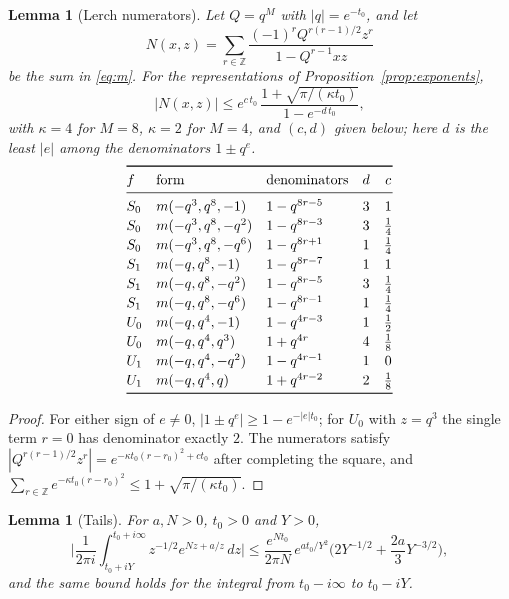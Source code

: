 \documentclass[11pt]{amsart}
\newtheorem{lemma}[theorem]{Lemma}
\theoremstyle{definition}
\theoremstyle{remark}
\numberwithin{equation}{section}
\newcommand{\Z}{\mathbb{Z}}
\begin{document}
\begin{lemma}[Lerch numerators]\label{lem:lerch}
Let $Q=q^M$ with $|q|=e^{-t_0}$, and let
\[
N(x,z)=\sum_{r\in\Z}\frac{(-1)^rQ^{r(r-1)/2}z^r}{1-Q^{r-1}xz}
\]
be the sum in \eqref{eq:m}.
For the representations of Proposition~\ref{prop:exponents},
\[
|N(x,z)|\le e^{c\,t_0}\,\frac{1+\sqrt{\pi/(\kappa t_0)}}{1-e^{-d\,t_0}},
\]
with $\kappa=4$ for $M=8$, $\kappa=2$ for $M=4$, and $(c,d)$ given below; here $d$ is the least $|e|$ among the denominators $1\pm q^{e}$.
\[
\renewcommand{\arraystretch}{1.15}
\begin{array}{@{}lllcc@{}}
\toprule
f & \text{form} & \text{denominators} & d & c\\ \midrule
S_0 & m(-q^3,q^8,-1) & 1-q^{8r-5} & 3 & 1\\
S_0 & m(-q^3,q^8,-q^2) & 1-q^{8r-3} & 3 & \tfrac14\\
S_0 & m(-q^3,q^8,-q^6) & 1-q^{8r+1} & 1 & \tfrac14\\
S_1 & m(-q,q^8,-1) & 1-q^{8r-7} & 1 & 1\\
S_1 & m(-q,q^8,-q^2) & 1-q^{8r-5} & 3 & \tfrac14\\
S_1 & m(-q,q^8,-q^6) & 1-q^{8r-1} & 1 & \tfrac14\\
U_0 & m(-q,q^4,-1) & 1-q^{4r-3} & 1 & \tfrac12\\
U_0 & m(-q,q^4,q^3) & 1+q^{4r} & 4 & \tfrac18\\
U_1 & m(-q,q^4,-q^2) & 1-q^{4r-1} & 1 & 0\\
U_1 & m(-q,q^4,q) & 1+q^{4r-2} & 2 & \tfrac18\\ \bottomrule
\end{array}
\]
\end{lemma}

\begin{proof}
For either sign of $e\neq0$, $|1\pm q^e|\ge1-e^{-|e|t_0}$; for $U_0$ with $z=q^3$ the single term $r=0$ has denominator exactly $2$.
The numerators satisfy $|Q^{r(r-1)/2}z^r|=e^{-\kappa t_0(r-r_0)^2+ct_0}$ after completing the square, and $\sum_{r\in\Z}e^{-\kappa t_0(r-r_0)^2}\le1+\sqrt{\pi/(\kappa t_0)}$.
\end{proof}

\begin{lemma}[Tails]\label{lem:tail}
For $a,N>0$, $t_0>0$ and $Y>0$,
\[
\Big|\frac1{2\pi i}\int_{t_0+iY}^{t_0+i\infty}z^{-1/2}e^{Nz+a/z}\,dz\Big|\le\frac{e^{Nt_0}}{2\pi N}\,e^{at_0/Y^2}\Big(2Y^{-1/2}+\frac{2a}3Y^{-3/2}\Big),
\]
and the same bound holds for the integral from $t_0-i\infty$ to $t_0-iY$.
\end{lemma}
\end{document}
